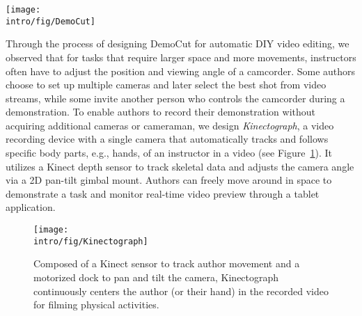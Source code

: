 \begin{figure*}[t]
  \centering
  \texttt{[image: \\intro/fig/DemoCut]}
  \caption{DemoCut asks authors to mark key moments in a recorded video of demonstration using a set of marker types. Based on marker information, the system uses audio and video analysis to automatically organize the video into meaningful segments and apply appropriate video editing effects, which can be modified via a playback UI.}
  \label{fig:democut_intro}
\end{figure*}

Through the process of designing DemoCut for automatic DIY video editing, we observed that for tasks that require larger space and more movements, instructors often have to adjust the position and viewing angle of a camcorder. Some authors choose to set up multiple cameras and later select the best shot from video streams, while some invite another person who controls the camcorder during a demonstration.
%
To enable authors to record their demonstration without acquiring additional cameras or cameraman, we design \emph{Kinectograph}, a video recording device with a single camera that automatically tracks and follows specific body parts, e.g., hands, of an instructor in a video (see Figure~\ref{fig:kinectograph_intro}). It utilizes a Kinect depth sensor to track skeletal data and adjusts the camera angle via a 2D pan-tilt gimbal mount. Authors can freely move around in space to demonstrate a task and monitor real-time video preview through a tablet application.

\begin{figure}[!t]
  \centering
  \texttt{[image: \\intro/fig/Kinectograph]}
  \caption{Composed of a Kinect sensor to track author movement and a motorized dock to pan and tilt the camera, Kinectograph continuously centers the author (or their hand) in the recorded video for filming physical activities.}
\label{fig:kinectograph_intro}
\end{figure}


